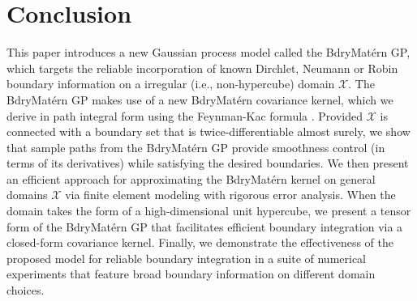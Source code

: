 \documentclass[aos,preprint]{imsart}
\theoremstyle{plain}
\theoremstyle{remark}
\begin{document}
\section{Conclusion}
\label{sec:conclusion}
This paper introduces a new Gaussian process model called the BdryMat\'ern GP, which targets the reliable incorporation of known Dirchlet, Neumann or Robin boundary information on a irregular (i.e., non-hypercube) domain $\mathcal{X}$. The BdryMat\'ern GP makes use of a new BdryMat\'ern covariance kernel, which we derive in path integral form using the Feynman-Kac formula \citep{ito1957fundamental,stroock1971diffusion,papanicolaou1990probabilistic}. Provided $\mathcal{X}$ is connected with a boundary set that is twice-differentiable almost surely, we show that sample paths from the BdryMat\'ern GP provide smoothness control (in terms of its derivatives) while satisfying the desired boundaries. We then present an efficient approach for approximating the BdryMat\'ern kernel on general domains $\mathcal{X}$ via finite element modeling with rigorous error analysis. When the domain takes the form of a high-dimensional unit hypercube, we present a tensor form of the BdryMat\'ern GP that facilitates efficient boundary integration via a closed-form covariance kernel. Finally, we demonstrate the effectiveness of the proposed model for reliable boundary integration in a suite of numerical experiments that feature broad boundary information on different domain choices.

 
\end{document}
